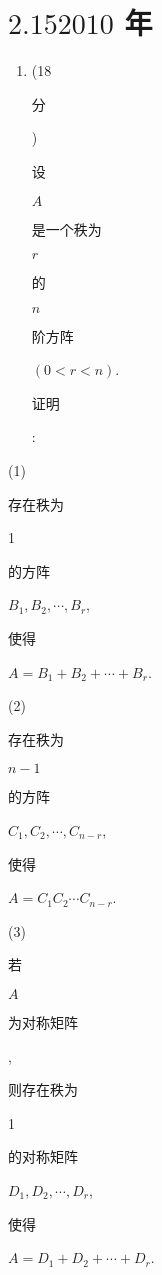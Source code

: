 \documentclass[10pt]{article}
\begin{document}
\section{$2.152010$ 年}
\begin{enumerate}
  \item (18 \begin{CJK}{UTF8}{mj}分\end{CJK}) \begin{CJK}{UTF8}{mj}设\end{CJK} $A$ \begin{CJK}{UTF8}{mj}是一个秩为\end{CJK} $r$ \begin{CJK}{UTF8}{mj}的\end{CJK} $n$ \begin{CJK}{UTF8}{mj}阶方阵\end{CJK} $(0<r<n)$. \begin{CJK}{UTF8}{mj}证明\end{CJK}:
\end{enumerate}
(1) \begin{CJK}{UTF8}{mj}存在秩为\end{CJK} 1 \begin{CJK}{UTF8}{mj}的方阵\end{CJK} $B_{1}, B_{2}, \cdots, B_{r}$, \begin{CJK}{UTF8}{mj}使得\end{CJK} $A=B_{1}+B_{2}+\cdots+B_{r}$.

(2) \begin{CJK}{UTF8}{mj}存在秩为\end{CJK} $n-1$ \begin{CJK}{UTF8}{mj}的方阵\end{CJK} $C_{1}, C_{2}, \cdots, C_{n-r}$, \begin{CJK}{UTF8}{mj}使得\end{CJK} $A=C_{1} C_{2} \cdots C_{n-r}$.

(3) \begin{CJK}{UTF8}{mj}若\end{CJK} $A$ \begin{CJK}{UTF8}{mj}为对称矩阵\end{CJK}, \begin{CJK}{UTF8}{mj}则存在秩为\end{CJK} 1 \begin{CJK}{UTF8}{mj}的对称矩阵\end{CJK} $D_{1}, D_{2}, \cdots, D_{r}$, \begin{CJK}{UTF8}{mj}使得\end{CJK} $A=D_{1}+D_{2}+\cdots+D_{r}$.
\end{document}
